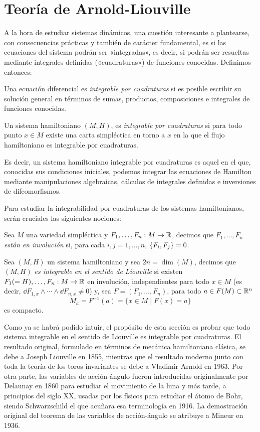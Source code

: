 \section{Teoría de Arnold-Liouville}\label{6}
A la hora de estudiar sistemas dinámicos, una cuestión interesante a plantearse, con consecuencias prácticas y también de carácter fundamental, es si las ecuaciones del sistema podrán ser «integradas», es decir, si podrán ser resueltas mediante integrales definidas («cuadraturas») de funciones conocidas. Definimos entonces:
\begin{defn}
  Una ecuación diferencial es \emph{integrable por cuadraturas} si es posible escribir su solución general en términos de sumas, productos, composiciones e integrales de funciones conocidas. 
\end{defn}
\begin{defn}
  Un sistema hamiltoniano $(M,H)$, es \emph{integrable por cuadraturas} si para todo punto $x\in M$ existe una carta simpléctica en torno a $x$ en la que el flujo hamiltoniano es integrable por cuadraturas.
\end{defn}
Es decir, un sistema hamiltoniano integrable por cuadraturas es aquel en el que, conocidas sus condiciones iniciales, podemos integrar las ecuaciones de Hamilton mediante manipulaciones algebraicas, cálculos de integrales definidas e inversiones de difeomorfismos.

Para estudiar la integrabilidad por cuadraturas de los sistemas hamiltonianos, serán cruciales las siguientes nociones:
\begin{defn}
  Sea $M$ una variedad simpléctica y $F_1,\dots,F_n:M \rightarrow \mathbb{R}$, decimos que $F_1,\dots,F_n$ \emph{están en involución} si, para cada $i,j=1,\dots,n$, $\left\lbrace F_i,F_j\right\rbrace=0$.
\end{defn}
\begin{defn}
  Sea $(M,H)$ un sistema hamiltoniano y sea $2n=\dim(M)$, decimos que $(M,H)$ \emph{es integrable en el sentido de Liouville} si existen $F_1(=H),\dots,F_n:M \rightarrow \mathbb{R}$ en involución, independientes para todo $x \in M$ (es decir, $\dd F_{1,x}\wedge \cdots \wedge \dd F_{n,x} \neq 0$) y, sea $F=(F_1,\dots,F_n)$, para todo $a \in F(M)\subset \mathbb{R}^n$
  \[
    M_a=F^{-1}(a)=\{x \in M \mid F(x)=a\}
  \]
  es compacto.
\end{defn}

Como ya se habrá podido intuir, el propósito de esta sección es probar que todo sistema integrable en el sentido de Liouville es integrable por cuadraturas. El resultado original, formulado en términos de mecánica hamiltoniana clásica, se debe a Joseph Liouville en 1855, mientras que el resultado moderno junto con toda la teoría de los toros invariantes se debe a Vladimir Arnold en 1963. Por otra parte, las variables de acción-ángulo fueron introducidas originalmente por Delaunay en 1860 para estudiar el movimiento de la luna y más tarde, a principios del siglo XX, usadas por los físicos para estudiar el átomo de Bohr, siendo Schwarzschild el que acuñara esa terminología en 1916. La demostración original del teorema de las variables de acción-ángulo se atribuye a Mineur en 1936. 

